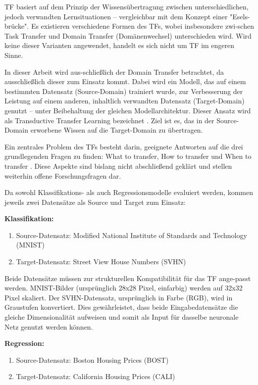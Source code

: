 TF basiert auf dem Prinzip der Wissensübertragung zwischen unterschiedlichen, jedoch verwandten 
Lernsituationen – vergleichbar mit dem Konzept einer "Esels-brücke". Es existieren verschiedene Formen des TFs, wobei 
insbesondere zwi-schen Task Transfer und Domain Transfer (Domänenwechsel) unterschieden wird. Wird keine dieser Varianten 
angewendet, handelt es sich nicht um TF im engeren Sinne.

In dieser Arbeit wird aus-schließlich der Domain Transfer betrachtet, da ausschließlich dieser zum Einsatz kommt. Dabei wird ein Modell, das auf 
einem bestimmten Datensatz (Source-Domain) trainiert wurde, zur Verbesserung der Leistung auf einem anderen, inhaltlich verwandten Datensatz 
(Target-Domain) genutzt – unter Beibehaltung der gleichen Modellarchitektur. Dieser Ansatz wird als Transductive Transfer Learning bezeichnet 
\cite{survey_transfer}. Ziel ist es, das in der Source-Domain erworbene Wissen auf die Target-Domain zu übertragen.

Ein zentrales Problem des TFs besteht darin, geeignete Antworten auf die drei grundlegenden Fragen zu finden: What to transfer, How 
to transfer und When to transfer \cite{survey_transfer}. Diese Aspekte sind bislang nicht abschließend geklärt und stellen weiterhin offene 
Forschungsfragen dar.

Da sowohl Klassifikations- als auch Regressionsmodelle evaluiert werden, kommen jeweils zwei Datensätze als Source und Target zum Einsatz:

\textbf{Klassifikation:}
\begin{enumerate}
    \item Source-Datensatz: Modified National Institute of Standards and Technology (MNIST) \cite{handwritten_digit}
    \item Target-Datensatz: Street View House Numbers (SVHN) \cite{house_numbers}
\end{enumerate}

Beide Datensätze müssen zur strukturellen Kompatibilität für das TF ange-passt werden. MNIST-Bilder (ursprünglich 28x28 Pixel, 
einfarbig) werden auf 32x32 Pixel skaliert. Der SVHN-Datensatz, ursprünglich in Farbe (RGB), wird in Graustufen konvertiert. Dies gewährleistet, 
dass beide Eingabedatensätze die gleiche Dimensionalität aufweisen und somit als Input für dasselbe neuronale Netz genutzt werden können.

\textbf{Regression:}
\begin{enumerate}
    \item Source-Datensatz: Boston Housing Prices (BOST) \cite{Boston_housing}
    \item Target-Datensatz: California Housing Prices (CALI) \cite{California_housing}
\end{enumerate}


